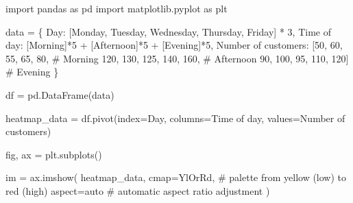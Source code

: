 \documentclass[
  english,
  letterpaper,
  DIV=11,
  numbers=noendperiod]{scrreprt}
\newenvironment{Shaded}{\begin{snugshade}}{\end{snugshade}}
\newcommand{\CommentTok}[1]{\textcolor[rgb]{0.37,0.37,0.37}{#1}}
\newcommand{\DecValTok}[1]{\textcolor[rgb]{0.68,0.00,0.00}{#1}}
\newcommand{\ImportTok}[1]{\textcolor[rgb]{0.00,0.46,0.62}{#1}}
\newcommand{\NormalTok}[1]{\textcolor[rgb]{0.00,0.23,0.31}{#1}}
\newcommand{\OperatorTok}[1]{\textcolor[rgb]{0.37,0.37,0.37}{#1}}
\newcommand{\StringTok}[1]{\textcolor[rgb]{0.13,0.47,0.30}{#1}}
\begin{document}
\begin{Shaded}
\begin{Highlighting}[]
\ImportTok{import}\NormalTok{ pandas }\ImportTok{as}\NormalTok{ pd}
\ImportTok{import}\NormalTok{ matplotlib.pyplot }\ImportTok{as}\NormalTok{ plt}

\NormalTok{data }\OperatorTok{=}\NormalTok{ \{}
    \StringTok{\textquotesingle{}Day\textquotesingle{}}\NormalTok{: [}\StringTok{\textquotesingle{}Monday\textquotesingle{}}\NormalTok{, }\StringTok{\textquotesingle{}Tuesday\textquotesingle{}}\NormalTok{, }\StringTok{\textquotesingle{}Wednesday\textquotesingle{}}\NormalTok{, }\StringTok{\textquotesingle{}Thursday\textquotesingle{}}\NormalTok{, }\StringTok{\textquotesingle{}Friday\textquotesingle{}}\NormalTok{] }\OperatorTok{*} \DecValTok{3}\NormalTok{,}
    \StringTok{\textquotesingle{}Time of day\textquotesingle{}}\NormalTok{: [}\StringTok{\textquotesingle{}Morning\textquotesingle{}}\NormalTok{]}\OperatorTok{*}\DecValTok{5} \OperatorTok{+}\NormalTok{ [}\StringTok{\textquotesingle{}Afternoon\textquotesingle{}}\NormalTok{]}\OperatorTok{*}\DecValTok{5} \OperatorTok{+}\NormalTok{ [}\StringTok{\textquotesingle{}Evening\textquotesingle{}}\NormalTok{]}\OperatorTok{*}\DecValTok{5}\NormalTok{,}
    \StringTok{\textquotesingle{}Number of customers\textquotesingle{}}\NormalTok{: [}\DecValTok{50}\NormalTok{, }\DecValTok{60}\NormalTok{, }\DecValTok{55}\NormalTok{, }\DecValTok{65}\NormalTok{, }\DecValTok{80}\NormalTok{,    }\CommentTok{\# Morning}
                            \DecValTok{120}\NormalTok{, }\DecValTok{130}\NormalTok{, }\DecValTok{125}\NormalTok{, }\DecValTok{140}\NormalTok{, }\DecValTok{160}\NormalTok{,  }\CommentTok{\# Afternoon}
                            \DecValTok{90}\NormalTok{, }\DecValTok{100}\NormalTok{, }\DecValTok{95}\NormalTok{, }\DecValTok{110}\NormalTok{, }\DecValTok{120}\NormalTok{]    }\CommentTok{\# Evening}
\NormalTok{\}}

\NormalTok{df }\OperatorTok{=}\NormalTok{ pd.DataFrame(data)}

\NormalTok{heatmap\_data }\OperatorTok{=}\NormalTok{ df.pivot(index}\OperatorTok{=}\StringTok{\textquotesingle{}Day\textquotesingle{}}\NormalTok{, columns}\OperatorTok{=}\StringTok{\textquotesingle{}Time of day\textquotesingle{}}\NormalTok{, values}\OperatorTok{=}\StringTok{\textquotesingle{}Number of customers\textquotesingle{}}\NormalTok{)}

\NormalTok{fig, ax }\OperatorTok{=}\NormalTok{ plt.subplots()}

\NormalTok{im }\OperatorTok{=}\NormalTok{ ax.imshow(}
\NormalTok{    heatmap\_data,}
\NormalTok{    cmap}\OperatorTok{=}\StringTok{\textquotesingle{}YlOrRd\textquotesingle{}}\NormalTok{,      }\CommentTok{\# palette from yellow (low) to red (high)}
\NormalTok{    aspect}\OperatorTok{=}\StringTok{\textquotesingle{}auto\textquotesingle{}}       \CommentTok{\# automatic aspect ratio adjustment}
\NormalTok{)}


\end{Highlighting}
\end{Shaded}
\end{document}

